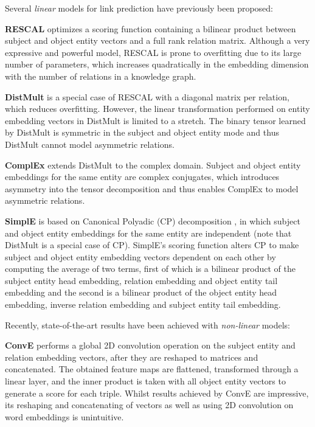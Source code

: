 \documentclass[11pt,a4paper]{article}
\begin{document}
\begin{table}[!t]
  \label{table:models}
\end{table}

Several \textit{linear} models for link prediction have previously been proposed:

\noindent\textbf{RESCAL} \cite{nickel2011three} optimizes a scoring function containing a bilinear product between subject and object entity vectors and a full rank relation matrix. Although a very expressive and powerful model, RESCAL is prone to overfitting due to its large number of parameters, which increases quadratically in the embedding dimension with the number of relations in a knowledge graph. 

\noindent\textbf{DistMult} \cite{yang2014embedding} is a special case of RESCAL with a diagonal matrix per relation, which reduces overfitting. However, the linear transformation performed on entity embedding vectors in DistMult is limited to a stretch. The binary tensor learned by DistMult is symmetric in the subject and object entity mode and thus DistMult cannot model asymmetric relations. 

\noindent\textbf{ComplEx} \cite{trouillon2016complex} extends DistMult to the complex domain. Subject and object entity embeddings for the same entity are complex conjugates, which introduces asymmetry into the tensor decomposition and thus enables ComplEx to model asymmetric relations.

\noindent\textbf{SimplE} \cite{kazemi2018simple} is based on Canonical Polyadic (CP) decomposition \cite{hitchcock1927expression}, in which subject and object entity embeddings for the same entity are independent (note that DistMult is a special case of CP). SimplE's scoring function alters CP to make subject and object entity embedding vectors dependent on each other by computing the average of two terms, first of which is a bilinear product of the subject entity head embedding, relation embedding and object entity tail embedding and the second is a bilinear product of the object entity head embedding, inverse relation embedding and subject entity tail embedding.

Recently, state-of-the-art results have been achieved with \textit{non-linear} models:

\noindent\textbf{ConvE} \cite{dettmers2018convolutional} performs a global 2D convolution operation on the subject entity and relation embedding vectors, after they are reshaped to matrices and concatenated. The obtained feature maps are flattened, transformed through a linear layer, and the inner product is taken with all object entity vectors to generate a score for each triple. Whilst results achieved by ConvE are impressive, its reshaping and concatenating of vectors as well as using 2D convolution on word embeddings is unintuitive. 
\end{document}
